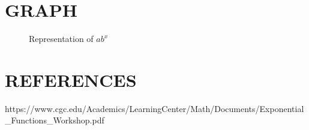 \documentclass[10pt]{article}
\begin{document}
\section*{\normalsize \textbf{GRAPH}}
\begin{figure}
\graphicspath{ {./Function6/}}
  \hfill
  \caption{Representation of $ab^x$}
\end{figure}
\section*{\normalsize \textbf{REFERENCES}}
https://www.cgc.edu/Academics/LearningCenter/Math/Documents/Exponential_Functions_Workshop.pdf
\end{document}
